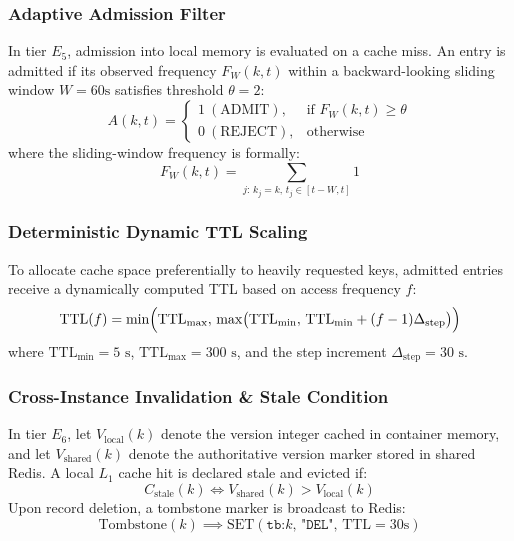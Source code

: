 \documentclass[conference]{IEEEtran}
\begin{document}
\subsubsection{Adaptive Admission Filter}
In tier $E_5$, admission into local memory is evaluated on a cache miss. An entry is admitted if its observed frequency $F_W(k, t)$ within a backward-looking sliding window $W = 60\text{s}$ satisfies threshold $\theta = 2$:
\begin{equation}
A(k, t) = \begin{cases} 
1 \ (\text{ADMIT}), & \text{if } F_W(k, t) \ge \theta \\ 
0 \ (\text{REJECT}), & \text{otherwise} 
\end{cases}
\end{equation}
where the sliding-window frequency is formally:
\begin{equation}
F_W(k, t) = \sum_{j:\, k_j = k,\, t_j \in [t - W, t]} 1
\end{equation}

\subsubsection{Deterministic Dynamic TTL Scaling}
To allocate cache space preferentially to heavily requested keys, admitted entries receive a dynamically computed TTL based on access frequency $f$:
\begin{equation}
\text{TTL}(f) = \min\Bigl(\text{TTL}_{\max},\, \max\bigl(\text{TTL}_{\min},\, \text{TTL}_{\min} + (f - 1) \Delta_{\text{step}}\bigr)\Bigr)
\end{equation}
where $\text{TTL}_{\min} = 5\text{ s}$, $\text{TTL}_{\max} = 300\text{ s}$, and the step increment $\Delta_{\text{step}} = 30\text{ s}$.

\subsubsection{Cross-Instance Invalidation \& Stale Condition}
In tier $E_6$, let $V_{\text{local}}(k)$ denote the version integer cached in container memory, and let $V_{\text{shared}}(k)$ denote the authoritative version marker stored in shared Redis. A local $L_1$ cache hit is declared stale and evicted if:
\begin{equation}
C_{\text{stale}}(k) \iff V_{\text{shared}}(k) > V_{\text{local}}(k)
\end{equation}
Upon record deletion, a tombstone marker is broadcast to Redis:
\begin{equation}
\text{Tombstone}(k) \implies \text{SET}(\texttt{tb:}k,\, \texttt{"DEL"},\, \text{TTL}=30\text{s})
\end{equation}
\end{document}
